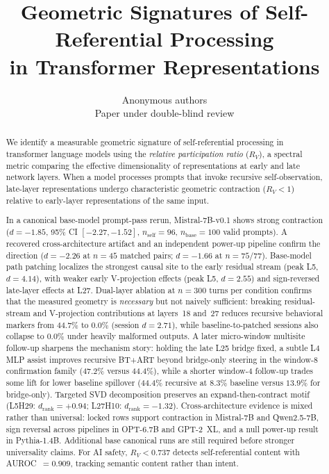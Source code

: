 \documentclass{article}
\title{Geometric Signatures of Self-Referential Processing\\
       in Transformer Representations}
\author{Anonymous authors\\Paper under double-blind review}
\newcommand{\RV}{R_V}
\newcommand{\dcohen}{d}
\begin{document}
\ifcolmsubmission
\linenumbers
\fi

\maketitle

\begin{abstract}
We identify a measurable geometric signature of self-referential processing in transformer language
models using the \emph{relative participation ratio} ($\RV$), a spectral metric comparing the
effective dimensionality of representations at early and late network layers.
When a model processes prompts that invoke recursive self-observation, late-layer representations
undergo characteristic geometric contraction ($\RV < 1$) relative to early-layer representations
of the same input.

In a canonical base-model prompt-pass rerun, Mistral-7B-v0.1 shows strong contraction
($\dcohen = -1.85$, 95\% CI $[-2.27, -1.52]$, $n_\mathrm{self}=96$, $n_\mathrm{base}=100$ valid prompts).
A recovered cross-architecture artifact and an independent power-up pipeline confirm the direction
($\dcohen = -2.26$ at $n = 45$ matched pairs; $\dcohen = -1.66$ at $n = 75/77$).
Base-model path patching localizes the strongest causal site to the early residual stream
(peak L5, $\dcohen = 4.14$), with weaker early V-projection effects
(peak L5, $\dcohen = 2.55$) and sign-reversed late-layer effects at L27.
Dual-layer ablation at $n{=}300$ turns per condition confirms that the measured geometry is
\emph{necessary} but not naively sufficient: breaking residual-stream and V-projection contributions
at layers~18 and~27 reduces recursive behavioral markers from $44.7\%$ to $0.0\%$
(session $\dcohen = 2.71$), while baseline-to-patched sessions also collapse to $0.0\%$
under heavily malformed outputs.
A later micro-window multisite follow-up sharpens the mechanism story:
holding the late L25 bridge fixed, a subtle L4 MLP assist improves recursive BT+ART beyond
bridge-only steering in the window-8 confirmation family
($47.2\%$ versus $44.4\%$), while a shorter window-4 follow-up trades some lift for lower
baseline spillover ($44.4\%$ recursive at $8.3\%$ baseline versus $13.9\%$ for bridge-only).
Targeted SVD decomposition preserves an expand-then-contract motif
(L5H29: $\dcohen_{\mathrm{rank}} = +0.94$; L27H10: $\dcohen_{\mathrm{rank}} = -1.32$).
Cross-architecture evidence is mixed rather than universal: locked rows support contraction in
Mistral-7B and Qwen2.5-7B, sign reversal across pipelines in OPT-6.7B and GPT-2~XL, and a null
power-up result in Pythia-1.4B.
Additional base canonical runs are still required before stronger universality claims.
For AI safety, $\RV < 0.737$ detects self-referential content with AUROC~$= 0.909$,
tracking semantic content rather than intent.
\end{abstract}
\end{document}

